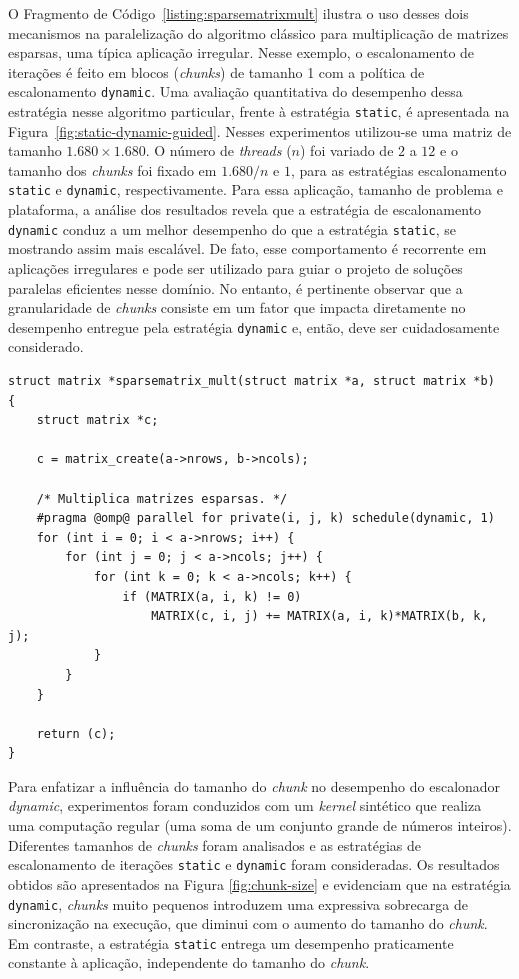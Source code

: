 \documentclass{SBCbookchapter}
\begin{document}
		O Fragmento de Código~\ref{listing:sparsematrixmult} ilustra o
		uso desses dois mecanismos na paralelização do algoritmo
		clássico para multiplicação de matrizes esparsas, uma típica
		aplicação irregular. Nesse exemplo, o escalonamento de iterações
		é feito em blocos (\textit{chunks}) de tamanho 1 com a política
		de escalonamento \texttt{dynamic}.  Uma avaliação quantitativa
		do desempenho dessa estratégia nesse algoritmo particular,
		frente à estratégia \texttt{static}, é apresentada na
		Figura~\ref{fig:static-dynamic-guided}. Nesses experimentos
		utilizou-se uma matriz de tamanho $1.680 \times 1.680$.  O
		número de \textit{threads} ($n$) foi variado de $2$ a $12$ e
		o tamanho dos \textit{chunks} foi fixado em $1.680/n$ e $1$,
		para as estratégias escalonamento \texttt{static} e
		\texttt{dynamic}, respectivamente.  Para essa aplicação,
		tamanho de problema e plataforma, a análise dos resultados
		revela que a estratégia de escalonamento \texttt{dynamic}
		conduz a um melhor desempenho do que a estratégia
		\texttt{static}, se mostrando assim mais escalável.  De
		fato, esse comportamento é recorrente em aplicações
		irregulares e pode ser utilizado para guiar o projeto de
		soluções paralelas eficientes nesse domínio. No entanto, é
		pertinente observar que a granularidade de \textit{chunks}
		consiste em um fator que impacta diretamente no desempenho
		entregue pela estratégia \texttt{dynamic} e, então, deve ser
		cuidadosamente considerado. 

\begin{lstlisting}[float,floatplacement=b,frame=single,caption=Exemplo de multiplicação de matrizes esparsas.,
label=listing:sparsematrixmult]
struct matrix *sparsematrix_mult(struct matrix *a, struct matrix *b)
{
	struct matrix *c;

	c = matrix_create(a->nrows, b->ncols);

	/* Multiplica matrizes esparsas. */
	#pragma @omp@ parallel for private(i, j, k) schedule(dynamic, 1)
	for (int i = 0; i < a->nrows; i++) {
		for (int j = 0; j < a->ncols; j++) {
			for (int k = 0; k < a->ncols; k++) {
				if (MATRIX(a, i, k) != 0)
					MATRIX(c, i, j) += MATRIX(a, i, k)*MATRIX(b, k, j);
			}
		}
	}

	return (c);
}
\end{lstlisting}

		Para enfatizar a influência do tamanho do \textit{chunk} no
		desempenho do escalonador \textit{dynamic}, experimentos foram
		conduzidos com um \textit{kernel} sintético que realiza uma
		computação regular (uma soma de um conjunto grande de números
		inteiros). Diferentes tamanhos de \textit{chunks} foram
		analisados e as estratégias de escalonamento de iterações
		\texttt{static} e \texttt{dynamic} foram consideradas. Os
		resultados obtidos são apresentados na Figura
		\ref{fig:chunk-size} e evidenciam que na estratégia
		\texttt{dynamic}, \textit{chunks} muito pequenos introduzem uma
		expressiva sobrecarga de sincronização na execução, que diminui
		com o aumento do tamanho do \textit{chunk}. Em contraste, a
		estratégia \texttt{static} entrega um desempenho praticamente
		constante à aplicação, independente do tamanho do \textit{chunk}.
\end{document}
